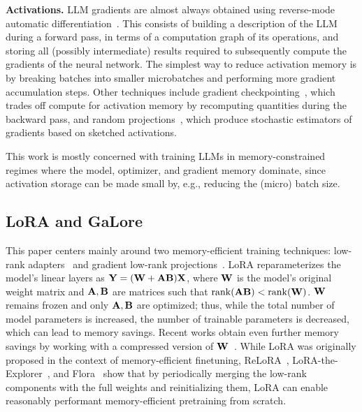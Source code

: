 \noindent\textbf{Activations.}
LLM gradients are almost always obtained using reverse-mode automatic differentiation~\citep{griewank}. 
This consists of building a description of the LLM during a forward pass, in terms of a computation graph of its operations, and storing all (possibly intermediate) results required to subsequently compute the gradients of the neural network. 
The simplest way to reduce activation memory is by breaking batches into smaller microbatches and performing more gradient accumulation steps. 
Other techniques include gradient checkpointing~\citep{chen2016training,checkmate}, which trades off compute for activation memory by recomputing quantities during the backward pass, and random projections~\citep{bershatsky,wta-rcs}, which produce stochastic estimators of gradients based on sketched activations. 


This work is mostly concerned with training LLMs in memory-constrained regimes where the model, optimizer, and gradient memory dominate, since activation storage can be made small by, e.g., reducing the (micro) batch size.

\vcram{-1mm}
\subsection{LoRA and GaLore}
\vcram{-1mm}
This paper centers mainly around two memory-efficient training techniques: low-rank adapters~\citep[LoRA;][]{lora} and gradient low-rank projections~\citep[GaLore;][]{galore}.
LoRA reparameterizes the model's linear layers as ${\mathbf{Y}} = ({\mathbf{W}} + {\mathbf{A}}{\mathbf{B}}){\mathbf{X}}$, where ${\mathbf{W}}$ is the model's original weight matrix and ${\mathbf{A}},{\mathbf{B}}$ are  matrices such that $\operatorname{rank}({\mathbf{A}}{\mathbf{B}}) < \operatorname{rank}({\mathbf{W}})$. 
${\mathbf{W}}$ remains frozen and only ${\mathbf{A}},{\mathbf{B}}$ are optimized; thus, while the {total} number of model parameters is {increased}, the number of {trainable parameters} is {decreased}, which can lead to memory savings. Recent works obtain even further memory savings by working with a compressed version of ${\mathbf{W}}$~\citep{qlora,guo2024lq,li2023loftq}.
While LoRA was originally proposed in the context of memory-efficient {finetuning}, ReLoRA~\citep{relora}, LoRA-the-Explorer~\citep{lte}, and Flora~\citep{hao2024flora} show that by periodically merging the low-rank components with the full weights and reinitializing them, LoRA can enable reasonably performant memory-efficient {pretraining} from scratch. 

